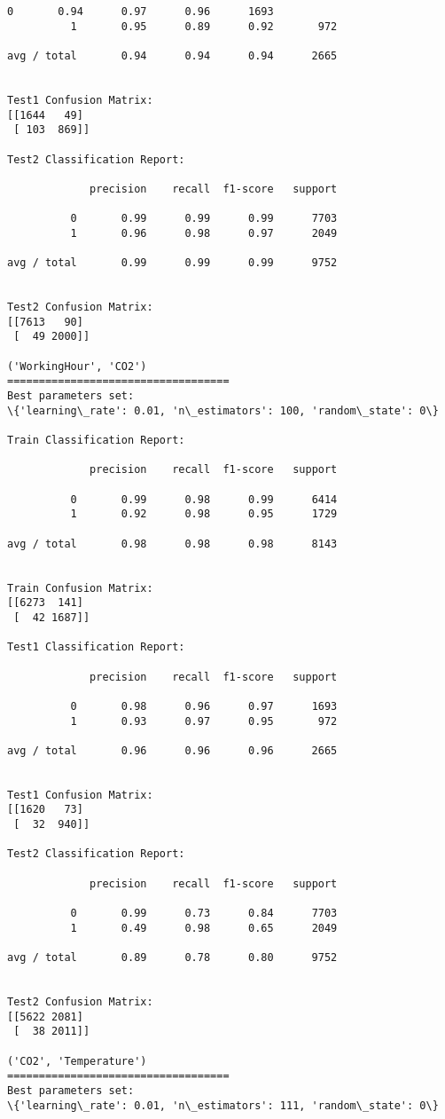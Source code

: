 \documentclass[11pt]{article}
\begin{document}
\begin{Verbatim}[commandchars=\\\{\}]
          0       0.94      0.97      0.96      1693
          1       0.95      0.89      0.92       972

avg / total       0.94      0.94      0.94      2665


Test1 Confusion Matrix:
[[1644   49]
 [ 103  869]]

Test2 Classification Report:

             precision    recall  f1-score   support

          0       0.99      0.99      0.99      7703
          1       0.96      0.98      0.97      2049

avg / total       0.99      0.99      0.99      9752


Test2 Confusion Matrix:
[[7613   90]
 [  49 2000]]

('WorkingHour', 'CO2')
===================================
Best parameters set:
\{'learning\_rate': 0.01, 'n\_estimators': 100, 'random\_state': 0\}

Train Classification Report:

             precision    recall  f1-score   support

          0       0.99      0.98      0.99      6414
          1       0.92      0.98      0.95      1729

avg / total       0.98      0.98      0.98      8143


Train Confusion Matrix:
[[6273  141]
 [  42 1687]]

Test1 Classification Report:

             precision    recall  f1-score   support

          0       0.98      0.96      0.97      1693
          1       0.93      0.97      0.95       972

avg / total       0.96      0.96      0.96      2665


Test1 Confusion Matrix:
[[1620   73]
 [  32  940]]

Test2 Classification Report:

             precision    recall  f1-score   support

          0       0.99      0.73      0.84      7703
          1       0.49      0.98      0.65      2049

avg / total       0.89      0.78      0.80      9752


Test2 Confusion Matrix:
[[5622 2081]
 [  38 2011]]

('CO2', 'Temperature')
===================================
Best parameters set:
\{'learning\_rate': 0.01, 'n\_estimators': 111, 'random\_state': 0\}


\end{Verbatim}
\end{document}
